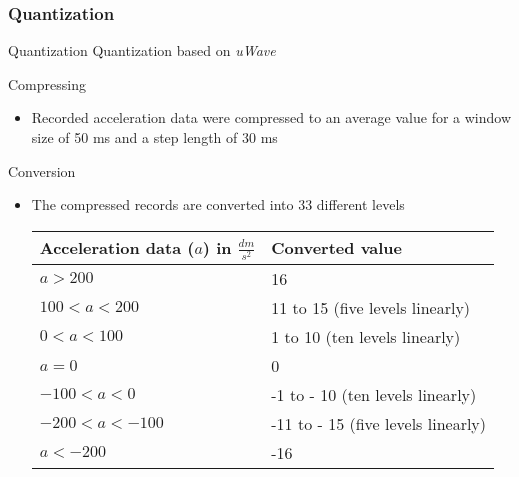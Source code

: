 \subsubsection{Quantization}

\begin{frame}{Quantization}
    Quantization based on \textit{uWave} \cite{liu2009uwave}
    
    \begin{block}{Compressing}
        \begin{itemize}
            \item Recorded acceleration data were compressed to an average value for a window size of 50
                ms and a step length of 30 ms
        \end{itemize}
    \end{block}
    
    \begin{block}{Conversion}
        \begin{itemize}
            \item The compressed records are converted into 33 different levels
            \begin{center}
                \tiny
                \begin{tabular}{ll}
                    \textbf{Acceleration data ($a$) in $\frac{dm}{s^2}$} & \textbf{Converted value}\\
                    \hline
                    $a > 200$ & 16\\
                    $100 < a < 200$ & 11 to 15 (five levels linearly)\\
                    $0 < a < 100$ & 1 to 10 (ten levels linearly)\\
                    $a = 0$ & 0\\
                    $-100 < a < 0$ & -1 to - 10 (ten levels linearly)\\
                    $-200 < a < -100$ & -11 to - 15 (five levels linearly)\\
                    $a < -200$ & -16
                \end{tabular}
            \end{center}
        \end{itemize}
    \end{block}
\end{frame}

